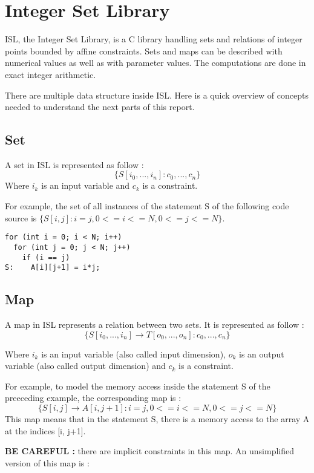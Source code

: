\chapter{Integer Set Library}\label{ch:ISL}

ISL, the Integer Set Library\cite{ISL}, is a C library handling sets and relations of integer points bounded by affine constraints. Sets and maps can be described with numerical values as well as with parameter values. The computations are done in exact integer arithmetic. 

There are multiple data structure inside ISL. Here is a quick overview of concepts needed to understand the next parts of this report. 

\section{Set}
A set in ISL is represented as follow :
\[
\{S[i_0,...,i_n]:c_0,...,c_n\}
\]
Where $i_k$ is an input variable and $c_k$ is a constraint.

For example, the set of all instances of the statement S of the following code source is $\{S[i,j]:i=j,0<=i<=N,0<=j<=N\}$.
\begin{lstlisting}[frame=single]
for (int i = 0; i < N; i++)
  for (int j = 0; j < N; j++)
    if (i == j)
S:    A[i][j+1] = i*j;
\end{lstlisting}

\section{Map}
A map in ISL represents a relation between two sets. It is represented as follow :
\[
\{S[i_0,...,i_n] \rightarrow T[o_0,...,o_n]:c_0,...,c_n\}
\]

Where $i_k$ is an input variable (also called input dimension), $o_k$ is an output variable (also called output dimension) and $c_k$ is a constraint.

For example, to model the memory access inside the statement S of the preeceding example, the corresponding map is :
\[
\{S[i,j] \rightarrow A[i,j+1]:i=j,0<=i<=N,0<=j<=N\}
\]
This map means that in the statement S, there is a memory access to the array A at the indices [i, j+1].

\textbf{BE CAREFUL :} there are implicit constraints in this map. An unsimplified version of this map is :

